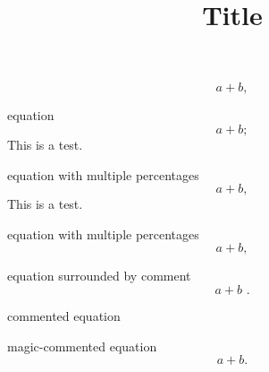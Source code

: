 \documentclass[12pt]{article}
\title{Title}
\author{}
\date{}
\begin{document}


\begin{equation}
  a+b
  ,
\end{equation}


equation
\begin{equation}
  a+b    ;
\end{equation}
This is a test.


equation with multiple percentages
%
%
\begin{equation}
  a+b,
\end{equation}
%
This is a test.

equation with multiple percentages
%
%
\begin{equation}
  a+b  ,
\end{equation}
%
%


equation surrounded by comment
%
\begin{equation}
  a+b 
  \,\, .
\end{equation}
%


commented equation


magic-commented equation
\begin{equation}
    a+b.
\end{equation}
\end{document}
